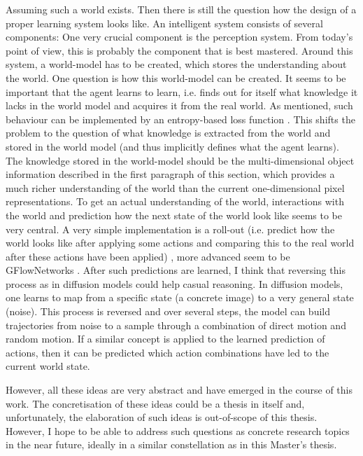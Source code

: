 Assuming such a world exists. Then there is still the question how the design of a proper learning system looks like. An intelligent system consists of several components: One very crucial component is the perception system. From today's point of view, this is probably the component that is best mastered. Around this system, a world-model has to be created, which stores the understanding about the world. One question is how this world-model can be created. It seems to be important that the agent learns to learn, i.e. finds out for itself what knowledge it lacks in the world model and acquires it from the real world. As mentioned, such behaviour can be implemented by an entropy-based loss function \cite{storck1995reinforcement}. This shifts the problem to the question of what knowledge is extracted from the world and stored in the world model (and thus implicitly defines what the agent learns). The knowledge stored in the world-model should be the multi-dimensional object information described in the first paragraph of this section, which provides a much richer understanding of the world than the current one-dimensional pixel representations. To get an actual understanding of the world, interactions with the world and prediction how the next state of the world look like seems to be very central. A very simple implementation is a roll-out (i.e. predict how the world looks like after applying some actions and comparing this to the real world after these actions have been applied) , more advanced seem to be GFlowNetworks . After such predictions are learned, I think that reversing this process as in diffusion models could help casual reasoning. In diffusion models, one learns to map from a specific state (a concrete image) to a very general state (noise). This process is reversed and over several steps, the model can build trajectories from noise to a sample through a combination of direct motion and random motion. If a similar concept is applied to the learned prediction of actions, then it can be predicted which action combinations have led to the current world state.

However, all these ideas are very abstract and have emerged in the course of this work. The concretisation of these ideas could be a thesis in itself and, unfortunately, the elaboration of such ideas is out-of-scope of this thesis. However, I hope to be able to address such questions as concrete research topics in the near future, ideally in a similar constellation as in this Master's thesis.
